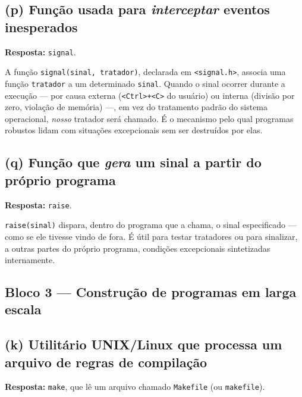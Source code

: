\documentclass[11pt,a4paper]{article}
\begin{document}
\subsection*{(p) Fun\c{c}\~ao usada para \emph{interceptar} eventos inesperados}

\begin{resposta}\textbf{Resposta:} \texttt{signal}.\end{resposta}

A fun\c{c}\~ao \texttt{signal(sinal, tratador)}, declarada em \texttt{<signal.h>}, associa uma fun\c{c}\~ao \texttt{tratador} a um determinado \texttt{sinal}. Quando o sinal ocorrer durante a execu\c{c}\~ao --- por causa externa (\texttt{<Ctrl>+<C>} do usu\'ario) ou interna (divis\~ao por zero, viola\c{c}\~ao de mem\'oria) ---, em vez do tratamento padr\~ao do sistema operacional, \emph{nosso} tratador ser\'a chamado. \'E o mecanismo pelo qual programas robustos lidam com situa\c{c}\~oes excepcionais sem ser destru\'idos por elas.

\subsection*{(q) Fun\c{c}\~ao que \emph{gera} um sinal a partir do pr\'oprio programa}

\begin{resposta}\textbf{Resposta:} \texttt{raise}.\end{resposta}

\texttt{raise(sinal)} dispara, dentro do programa que a chama, o sinal especificado --- como se ele tivesse vindo de fora. \'E \'util para testar tratadores ou para sinalizar, a outras partes do pr\'oprio programa, condi\c{c}\~oes excepcionais sintetizadas internamente.

\subsection*{Bloco 3 --- Constru\c{c}\~ao de programas em larga escala}

\subsection*{(k) Utilit\'ario UNIX/Linux que processa um arquivo de regras de compila\c{c}\~ao}

\begin{resposta}\textbf{Resposta:} \texttt{make}, que l\^e um arquivo chamado \texttt{Makefile} (ou \texttt{makefile}).\end{resposta}
\end{document}
